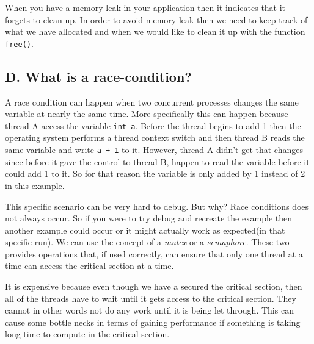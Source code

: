 \documentclass[11pt]{article}
\newcommand{\code}[1]{{\colorbox{lightgray!15}{\color{black}\texttt{#1}}}}
\begin{document}
When you have a memory leak in your application then it indicates that it forgets to clean up.
In order to avoid memory leak then we need to keep track of what we have allocated and when we would like to clean it up with the function \code{free()}.

\subsection{D. What is a race-condition?}
A race condition can happen when two concurrent processes changes the same variable at nearly the same time. 
More specifically this can happen because thread A access the variable \code{int a}. Before the thread begins to add 1 then the operating system performs a thread context switch and then thread B reads the same variable and write \code{a + 1} to it.
However, thread A didn't get that changes since before it gave the control to thread B, happen to read the variable before it could add 1 to it. So for that reason the variable is only added by 1 instead of 2 in this example.

This specific scenario can be very hard to debug. But why? Race conditions does not always occur. So if you were to try debug and recreate the example then another example could occur or it might actually work as expected(in that specific run).
We can use the concept of a \textit{mutex} or a \textit{semaphore}. These two provides operations that, if used correctly, can ensure that 
only one thread at a time can access the critical section at a time. 

It is expensive because even though we have a secured the critical section, then all of the threads have to wait until it gets access to
the critical section. They cannot in other words not do any work until it is being let through. This can cause some bottle necks in terms of 
gaining performance if something is taking long time to compute in the critical section.

\newpage

\end{document}

